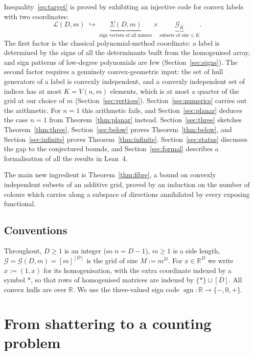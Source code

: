 \documentclass[11pt,a4paper]{article}
\theoremstyle{plain}
\theoremstyle{definition}
\DeclareMathOperator{\sgn}{sgn}
\newcommand{\R}{\mathbb{R}}
\newcommand{\Grid}{\mathcal{G}}
\begin{document}
Inequality~\eqref{eq:target} is proved by exhibiting an injective code for convex labels
with two coordinates:
\[
  \mathcal{L}(D,m)\;\hookrightarrow\;
  \underbrace{\Sigma(D,m)}_{\text{sign vectors of all minors}}\times
  \underbrace{\mathcal{G}_K}_{\text{subsets of size}\le K} .
\]
The first factor is the classical polynomial-method coordinate: a label is determined by
the signs of all the determinants built from the homogenised array, and sign patterns of
low-degree polynomials are few (Section~\ref{sec:signs}). The second factor requires a
genuinely convex-geometric input: the set of hull generators of a label is convexly independent,
and a convexly independent set of indices has at most $K=V(n,m)$ elements, which is at most a
quarter of the grid at our choice of $m$ (Section~\ref{sec:vertices}). Section~\ref{sec:numerics}
carries out the arithmetic. For $n=1$ this arithmetic fails, and Section~\ref{sec:planar}
deduces the case $n=1$ from Theorem~\ref{thm:planar} instead. Section~\ref{sec:three} sketches
Theorem~\ref{thm:three}, Section~\ref{sec:below} proves Theorem~\ref{thm:below}, and Section~\ref{sec:infinite} proves Theorem~\ref{thm:infinite}.
Section~\ref{sec:status} discusses the gap to the conjectured bounds,
and Section~\ref{sec:formal} describes a formalisation of all the results in Lean~4.

The main new ingredient is Theorem~\ref{thm:fibre}, a bound on convexly independent subsets of
an additive grid, proved by an induction on the number of colours which carries along a subspace of
directions annihilated by every exposing functional.

\subsection{Conventions}

Throughout, $D\ge1$ is an integer (so $n=D-1$), $m\ge1$ is a side length,
$\Grid=\Grid(D,m)=[m]^{[D]}$ is the grid of size $M:=m^D$. For
$x\in\R^D$ we write $\hat x:=(1,x)$ for its homogenisation, with the extra
coordinate indexed by a symbol $\ast$, so that rows of homogenised matrices are indexed by
$\{\ast\}\sqcup[D]$. All convex hulls are over $\R$. We use the three-valued sign code
$\sgn\colon\R\to\{-,0,+\}$.

\section{From shattering to a counting problem}\label{sec:counting}
\end{document}

